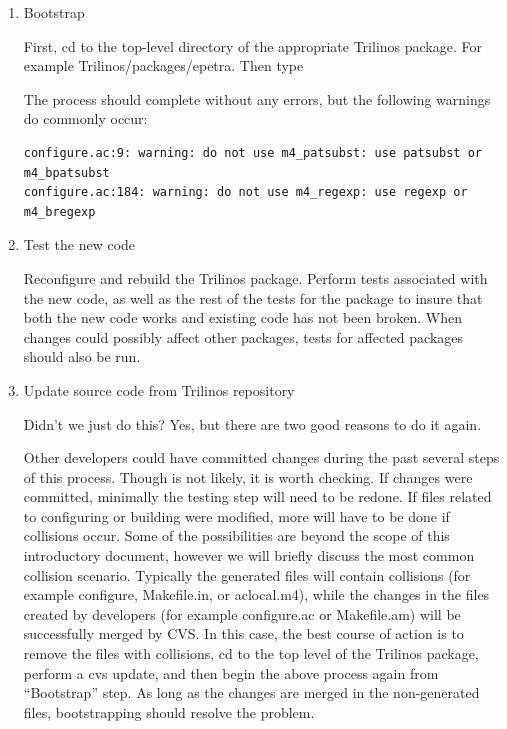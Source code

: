 \documentclass[12pt,relax]{TrilinosDevGuide}
\begin{document}
\begin{enumerate}
\item Bootstrap

First, cd to the top-level directory of the appropriate Trilinos package.  
For example Trilinos/packages/epetra.  Then type 


The process should complete without any errors, but the following warnings do 
commonly occur:

\begin{verbatim}
configure.ac:9: warning: do not use m4_patsubst: use patsubst or m4_bpatsubst
configure.ac:184: warning: do not use m4_regexp: use regexp or m4_bregexp
\end{verbatim}

\item Test the new code

Reconfigure and rebuild the Trilinos package.  Perform tests associated with 
the new code, as well as the rest of the tests for the package to insure that 
both the new code works and existing code has not been broken.  When changes 
could possibly affect other packages, tests for affected packages should also 
be run.

\item Update source code from Trilinos repository

Didn't we just do this?  Yes, but there are two good reasons to do it again.

Other developers could have committed changes during the past several 
steps of this process.  Though is not likely, it is worth checking.  If 
changes were committed, minimally the testing step will need to be redone.  
If files related to configuring or building were modified, more will have to 
be done if collisions occur.  Some of the possibilities are beyond the scope 
of this introductory document, however we will briefly discuss the most 
common collision scenario.  Typically the generated files will contain 
collisions (for example configure, Makefile.in, or aclocal.m4), while the 
changes in the files created by developers (for example configure.ac or 
Makefile.am) will be successfully merged by CVS.  In this case, the best 
course of action is to remove the files with collisions, cd to the top level 
of the Trilinos package, perform a cvs update, and then begin the above 
process again from ``Bootstrap'' step.  As long as the changes are merged in 
the non-generated files, bootstrapping should resolve the problem.


\end{enumerate}
\end{document}

